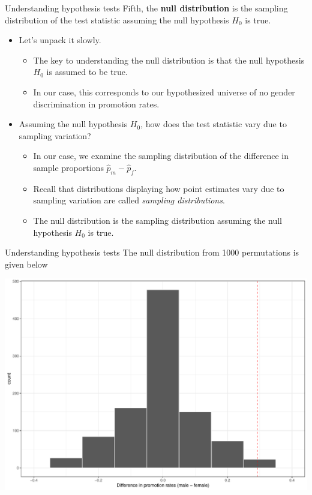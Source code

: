 \documentclass[
  ignorenonframetext,
]{beamer}
\providecommand{\tightlist}{%
  \setlength{\itemsep}{0pt}\setlength{\parskip}{0pt}}
\begin{document}
\begin{frame}{Understanding hypothesis tests}
\protect\hypertarget{understanding-hypothesis-tests-6}{}
Fifth, the \textbf{null distribution} is the sampling distribution of
the test statistic assuming the null hypothesis \(H_0\) is true.

\begin{itemize}
\item
  Let's unpack it slowly.

  \begin{itemize}
  \tightlist
  \item
    The key to understanding the null distribution is that the null
    hypothesis \(H_0\) is assumed to be true.
  \item
    In our case, this corresponds to our hypothesized universe of no
    gender discrimination in promotion rates.
  \end{itemize}
\item
  Assuming the null hypothesis \(H_0\), how does the test statistic vary
  due to sampling variation?

  \begin{itemize}
  \tightlist
  \item
    In our case, we examine the sampling distribution of the difference
    in sample proportions \(\hat{p}_m-\hat{p}_f\).
  \item
    Recall that distributions displaying how point estimates vary due to
    sampling variation are called \emph{sampling distributions}.
  \item
    The null distribution is the sampling distribution assuming the null
    hypothesis \(H_0\) is true.
  \end{itemize}
\end{itemize}
\end{frame}

\begin{frame}{Understanding hypothesis tests}
\protect\hypertarget{understanding-hypothesis-tests-7}{}
The null distribution from 1000 permutations is given below

\begin{center}\includegraphics[width=0.6\linewidth,height=0.4\textheight]{Week11_12_13_files/figure-beamer/unnamed-chunk-48-1} \end{center}
\end{frame}
\end{document}
